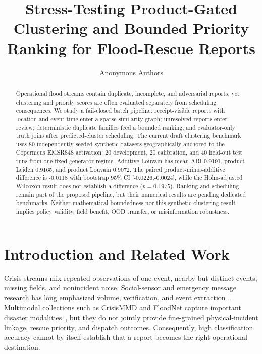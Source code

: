 \documentclass[runningheads]{llncs}
\begin{document}
\title{Stress-Testing Product-Gated Clustering and Bounded Priority
Ranking for Flood-Rescue Reports}

\author{Anonymous Authors}

\maketitle

\begin{abstract}
Operational flood streams contain duplicate, incomplete, and adversarial
reports, yet clustering and priority scores are often evaluated separately
from scheduling consequences. We study a fail-closed batch pipeline:
receipt-visible reports with location and event time enter a sparse
similarity graph; unresolved reports enter review; deterministic duplicate
families feed a bounded ranking; and evaluator-only truth joins after
predicted-cluster scheduling. The current draft clustering benchmark uses 80
independently seeded synthetic datasets geographically anchored to the
Copernicus EMSR848 activation: 20 development, 20 calibration, and 40 held-out
test runs from one fixed generator regime. Additive Louvain has mean ARI
0.9191, product Leiden 0.9165, and product Louvain 0.9072. The paired
product-minus-additive difference is -0.0118 with bootstrap 95\% CI
[-0.0226,-0.0024], while the Holm-adjusted Wilcoxon result does not establish
a difference ($p=0.1975$). Ranking and scheduling remain part of the proposed
pipeline, but their numerical results are pending dedicated benchmarks.
Neither mathematical boundedness nor this synthetic clustering result implies
policy validity, field benefit, OOD transfer, or misinformation robustness.
\end{abstract}

\section{Introduction and Related Work}

Crisis streams mix repeated observations of one event, nearby but distinct
events, missing fields, and nonincident noise. Social-sensor and emergency
message research has long emphasized volume, verification, and event
extraction~\cite{sakaki2010earthquake,atefeh2015survey,imran2015processing}. Multimodal
collections such as CrisisMMD and FloodNet capture important disaster
modalities~\cite{alam2018crisismmd,rahnemoonfar2021floodnet}, but they do not
jointly provide fine-grained physical-incident linkage, rescue priority, and
dispatch outcomes. Consequently, high classification accuracy cannot by
itself establish that a report becomes the right operational destination.
\end{document}
